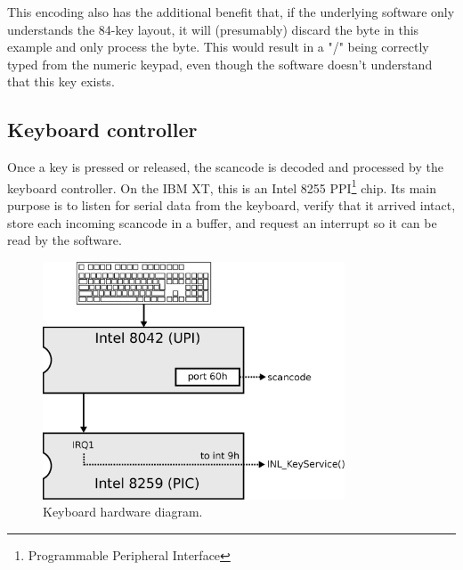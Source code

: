 \documentclass[book.tex]{subfiles}
\begin{document}
\par
This encoding also has the additional benefit that, if the underlying software only understands the 84-key layout, it will (presumably) discard the  byte in this example and only process the  byte. This would result in a "/" being correctly typed from the numeric keypad, even though the software doesn't understand that this key exists.\\




\subsection{Keyboard controller}
Once a key is pressed or released, the scancode is decoded and processed by the keyboard controller. On the IBM XT, this is an Intel 8255 PPI\footnote{Programmable Peripheral Interface} chip. Its main purpose is to listen for serial data from the keyboard, verify that it arrived intact, store each incoming scancode in a buffer, and request an interrupt so it can be read by the software.\\

\par
\begin{figure}[H]
  \centering
  \includegraphics[width=0.8\textwidth]{imgs/drawings/keyboard.eps}
  \caption{Keyboard hardware diagram.}
  \label{fig:pc_keyboard}
\end{figure}
\end{document}
